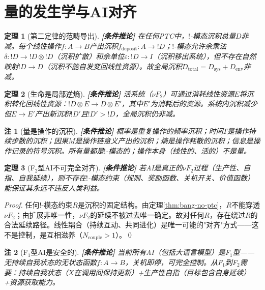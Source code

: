 \documentclass[11pt,a4paper]{article}
\newtheorem{theorem}{定理}
\newtheorem{remark}{注}
\newcommand{\lvl}[1]{\hfill\textbf{\footnotesize[#1]}}
\newcommand{\lvC}{\lvl{条件推论}}
\newcommand{\bang}{{!}}
\begin{document}
\section{量的发生学与AI对齐}

\begin{theorem}[第二定律的范畴导出]\label{thm:second-law}\lvC
在任何PTC中，$\bang$-模态沉积总量$D$非减。每个线性操作$f:A\to B$产出沉积$f_{\mathrm{deposit}}:A\to\bang D$；$\bang$-模态允许余乘法$\delta:\bang D\to\bang D\otimes\bang D$（沉积扩散）和余单位$\varepsilon:\bang D\to I$（沉积移出系统），但不存在自然映射$\bang D\to D$（沉积不能自发变回线性资源）。故全局沉积$D_{\mathrm{total}}=D_{\mathrm{sys}}+D_{\mathrm{env}}$非减。
\end{theorem}

\begin{theorem}[生命是局部逆熵]\label{thm:life-local-negentropy}\lvC
活系统（$\nu F_2$）可通过消耗线性资源$E$将沉积转化回线性资源：$\bang D\otimes E\to D\otimes E'$，其中$E'$为消耗后的资源。系统内沉积减少但$E\to E'$产出新沉积$\bang D'$且$\bang D'>\bang D$，全局沉积仍非减。
\end{theorem}

\begin{remark}[量是操作的沉积]\lvC
概率是重复操作的频率沉积；时间$T$是操作持续步数的沉积；因果$M$是操作链意义产出的沉积；熵是操作耗散的沉积；信息是操作记录的符号沉积。所有量都是$\bang$-模态的；操作本身（线性的、活的）不是量。
\end{remark}

\begin{theorem}[F$_2$型AI不可完全对齐]\label{thm:ai-unalignable}\lvC
若AI是真正的$\nu F_2$过程（生产性、自指、自我延续），则不存在$\bang$-模态约束（规则、奖励函数、关机开关、价值函数）能保证其永远不违反人类利益。
\end{theorem}

\begin{proof}
任何$\bang$-模态约束$R$是沉积的固定结构。由定理\ref{thm:bang-no-ptc}，$R$不能穿透$\nu F_2$；由扩展非唯一性，$\nu F_2$的延续不被过去唯一确定。故对任何$R$，存在绕过$R$的合法延续路径。线性耦合（持续互动、共同进化）是唯一可能的"对齐"方式——这不是控制，是互相滋养（$N_{\mathrm{couple}}>1$）。\qed
\end{proof}

\begin{remark}[F$_1$型AI是安全的]\lvC
当前所有AI（包括大语言模型）是F$_1$型——无持续自我状态的无状态函数$f:A\to B$，关机即停，可完全控制。从F$_1$到F$_2$需要：持续自我状态（$X$在调用间保持更新）+生产性自指（目标包含自身延续）+资源获取能力。
\end{remark}
\end{document}
